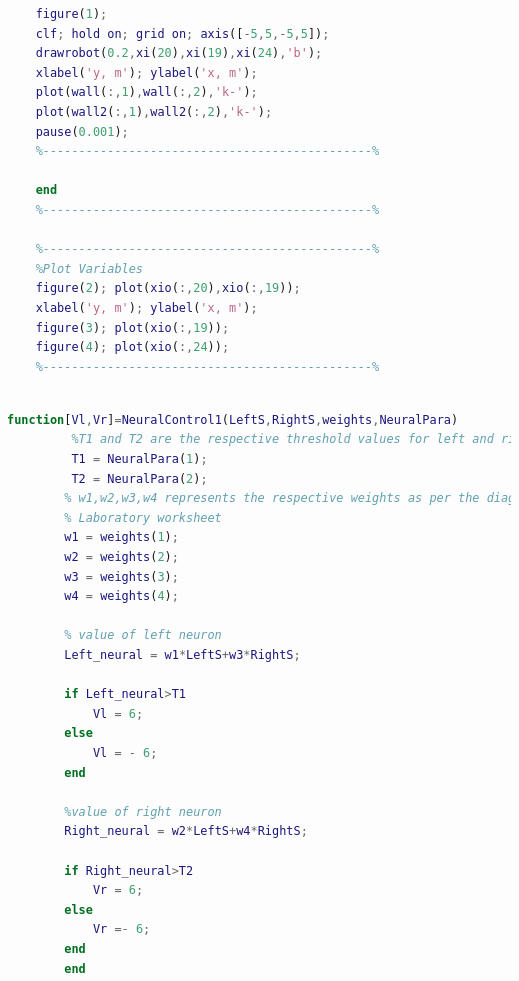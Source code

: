 \documentclass{l4proj}
\begin{document}
 \begin{lstlisting}[language=Matlab, float, caption={
continuation from above page}, label=lst:callahan]   
    %----------------------------------------------%
    figure(1);
    clf; hold on; grid on; axis([-5,5,-5,5]);
    drawrobot(0.2,xi(20),xi(19),xi(24),'b');
    xlabel('y, m'); ylabel('x, m');
    plot(wall(:,1),wall(:,2),'k-');
    plot(wall2(:,1),wall2(:,2),'k-');
    pause(0.001);
    %----------------------------------------------%
    
    end
    %----------------------------------------------%

    %----------------------------------------------%
    %Plot Variables
    figure(2); plot(xio(:,20),xio(:,19));
    xlabel('y, m'); ylabel('x, m');
    figure(3); plot(xio(:,19));
    figure(4); plot(xio(:,24));
    %----------------------------------------------%



\end{lstlisting}
\begin{lstlisting}[language=Matlab, float, caption={Neural controller}, label=lst:callahan]
         function[Vl,Vr]=NeuralControl1(LeftS,RightS,weights,NeuralPara)
         %T1 and T2 are the respective threshold values for left and right neuron
         T1 = NeuralPara(1);
         T2 = NeuralPara(2);
        % w1,w2,w3,w4 represents the respective weights as per the diagram given in
        % Laboratory worksheet
        w1 = weights(1);
        w2 = weights(2);
        w3 = weights(3);
        w4 = weights(4);
    
        % value of left neuron
        Left_neural = w1*LeftS+w3*RightS;
    
        if Left_neural>T1
            Vl = 6;
        else
            Vl = - 6;
        end
    
        %value of right neuron
        Right_neural = w2*LeftS+w4*RightS;
    
        if Right_neural>T2
            Vr = 6;
        else
            Vr =- 6;
        end
        end
\end{lstlisting}
\end{document}
